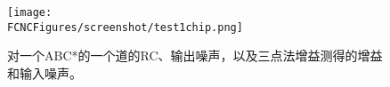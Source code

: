 \begin{figure}[H]
\centering
\texttt{[image: \\FCNCFigures/screenshot/test1chip.png]}
\caption{对一个ABC*的一个道的RC、输出噪声，以及三点法增益测得的增益和输入噪声。}
\label{fig:test1chip}
\end{figure}